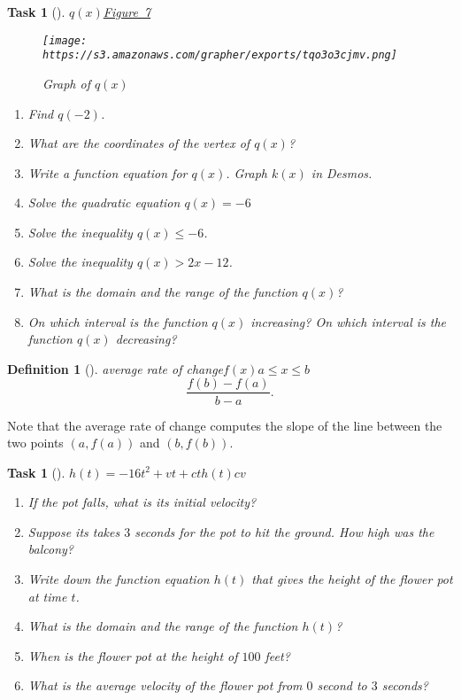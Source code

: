 \documentclass[10pt,]{article}
\theoremstyle{plain}
\newtheorem{proposition}[theorem]{Task}
\theoremstyle{definition}
\newtheorem{definition}[theorem]{Definition}
\numberwithin{equation}{section}
\newcommand{\gt}{>}
\begin{document}
\begin{proposition}[{}]\label{proposition-8}
\(q(x)\)\hyperref[quadratic-findformulaagain]{Figure~7}\begin{figure}
\centering
\texttt{[image: https://s3.amazonaws.com/grapher/exports/tqo3o3cjmv.png]}
\caption{Graph of \(q(x)\)\label{quadratic-findformulaagain}}
\end{figure}
\leavevmode%
\begin{enumerate}
\item\hypertarget{li-78}{}Find \(q(-2)\).%
\item\hypertarget{li-79}{}What are the coordinates of the vertex of \(q(x)\)?%
\item\hypertarget{li-80}{}Write a function equation for \(q(x)\). Graph \(k(x)\) in Desmos.%
\item\hypertarget{li-81}{}Solve the quadratic equation \(q(x)=-6\)%
\item\hypertarget{li-82}{}Solve the inequality \(q(x) \leq -6\).%
\item\hypertarget{li-83}{}Solve the inequality \(q(x) \gt 2x-12\).%
\item\hypertarget{li-84}{}What is the domain and the range of the function \(q(x)\)?%
\item\hypertarget{li-85}{}On which interval is the function \(q(x)\) increasing? On which interval is the function \(q(x)\) decreasing?%
\end{enumerate}
\end{proposition}
\begin{definition}[{}]\label{definition-3}
\emph{average rate of change}\(f(x)\)\(a \le x \le b\)%
\begin{equation*}
\frac{f(b)-f(a)}{b-a}.
\end{equation*}
\end{definition}
\hypertarget{p-53}{}%
Note that the average rate of change computes the slope of the line between the two points \((a,f(a))\) and \((b,f(b))\).%
\begin{proposition}[{}]\label{proposition-9}
\(h(t) = -16t^2+vt+c\)\(t\)\(h(t)\)\(c\)\(v\)\leavevmode%
\begin{enumerate}
\item\hypertarget{li-86}{}If the pot falls, what is its initial velocity?%
\item\hypertarget{li-87}{}Suppose its takes \(3\) seconds for the pot to hit the ground. How high was the balcony?%
\item\hypertarget{li-88}{}Write down the function equation \(h(t)\) that gives the height of the flower pot at time \(t\).%
\item\hypertarget{li-89}{}What is the domain and the range of the function \(h(t)\)?%
\item\hypertarget{li-90}{}When is the flower pot at the height of \(100\) feet?%
\item\hypertarget{li-91}{}What is the average velocity of the flower pot from \(0\) second to \(3\) seconds?%
\end{enumerate}
\end{proposition}
\end{document}

